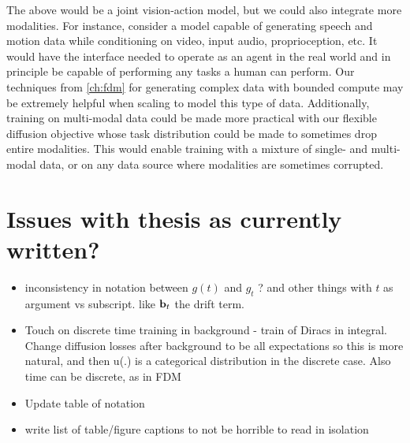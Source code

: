 The above would be a joint vision-action model, but we could also integrate more modalities. For instance, consider a model capable of generating speech and motion data while conditioning on video, input audio, proprioception, etc. It would have the interface needed to operate as an agent in the real world and in principle be capable of performing any tasks a human can perform. Our techniques from \cref{ch:fdm} for generating complex data with bounded compute may be extremely helpful when scaling to model this type of data. Additionally, training on multi-modal data could be made more practical with our flexible diffusion objective whose task distribution could be made to sometimes drop entire modalities. This would enable training with a mixture of single- and multi-modal data, or on any data source where modalities are sometimes corrupted.




\section*{Issues with thesis as currently written?}

\begin{itemize}
    \item inconsistency in notation between $g(t)$ and $g_t$ ? and other things with $t$ as argument vs subscript. like ${\mathbf{b}}_t$ the drift term.
    \item Touch on discrete time training in background - train of Diracs in integral. Change diffusion losses after background to be all expectations so this is more natural, and then u(.) is a categorical distribution in the discrete case. Also time can be discrete, as in FDM
    \item Update table of notation
    \item write list of table/figure captions to not be horrible to read in isolation
\end{itemize}

